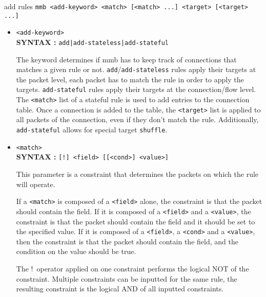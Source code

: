 \documentclass[a4paper,twoside,11pt]{report}
\makeatletter
\renewcommand{\section}{\@startsection{section}{1}{0mm}
  {\baselineskip}%
  {\baselineskip}{\LARGE\color{black}}}%
\makeatother
\begin{document}
\section{add rules}
\texttt{mmb <add-keyword> <match> [<match> ...] <target> [<target> ...]}
\begin{itemize}

\item \texttt{<add-keyword>}\\
   \textbf{SYNTAX :} \texttt{add|add-stateless|add-stateful} 

   The keyword determines if mmb has to keep track of connections that matches
   a given rule or not. \texttt{add}/\texttt{add-stateless} rules apply their
   targets at the packet level, each packet has to match the rule in order
   to apply the targets. \texttt{add-stateful} rules apply their targets at the
   connection/flow level. The \texttt{<match>} list of a stateful rule is used
   to add entries to the connection table. Once a connection is added to the table,
   the \texttt{<target>} list is applied to all packets of the connection, even if 
   they don't match the rule. Additionally, \texttt{add-stateful} allows for
   special target \texttt{shuffle}.

\item \texttt{<match>} \\
   \textbf{SYNTAX :} \texttt{[!]\ <field> [[<cond>] <value>]} 

   This parameter is a constraint that determines the packets on which the 
   rule will operate. 

   If a \texttt{<match>} is composed of a \texttt{<field>} alone, the constraint
   is that the packet should contain the field. If it is composed of a 
   \texttt{<field>} and a \texttt{<value>}, the constraint is that the packet 
   should contain the field and it should be set to the specified value. If it 
   is composed of a \texttt{<field>}, a \texttt{<cond>} and a \texttt{<value>},
   then the constraint is that the packet should contain the field, and the 
   condition on the value should be true.
   
   The !\ operator applied on one constraint performs the logical NOT of 
   the constraint. Multiple constraints can be inputted for the same rule, the 
   resulting constraint is the logical AND of all inputted constraints. 



\end{itemize}
\end{document}
